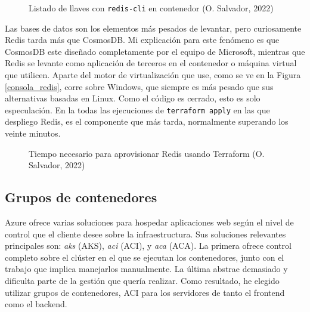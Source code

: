 \documentclass[11pt]{article}
\begin{document}
\begin{flushleft}
		\begin{figure}[htb]
			\centering
			\caption{Listado de llaves con \texttt{redis-cli} en contenedor (O. Salvador, 2022)}
		\end{figure}
	
	Las bases de datos son los elementos más pesados de levantar, pero curiosamente Redis tarda más que CosmosDB. Mi explicación para este fenómeno es que CosmosDB este diseñado completamente por el equipo de Microsoft, mientras que Redis se levante como aplicación de terceros en el contenedor o máquina virtual que utilicen. Aparte del motor de virtualización que use, como se ve en la Figura \ref{consola_redis}, corre sobre Windows, que siempre es más pesado que sus alternativas basadas en Linux. Como el código es cerrado, esto es solo especulación. En la todas las ejecuciones de \texttt{terraform apply} en las que despliego Redis, es el componente que más tarda, normalmente superando los veinte minutos.
	\linebreak
	
	\begin{figure}[htb]
		\centering
		\caption{Tiempo necesario para aprovisionar Redis usando Terraform (O. Salvador, 2022)}
	\end{figure}

	
	\bigskip
	\bigskip
	
	\subsection{Grupos de contenedores}
	Azure ofrece varias soluciones para hospedar aplicaciones web según el nivel de control que el cliente desee sobre la infraestructura. Sus soluciones relevantes principales son: \textit{\acrlong{aks}} (AKS), \textit{\acrlong{aci}} (ACI), y \textit{\acrlong{aca}} (ACA). La primera ofrece control completo sobre el clúster en el que se ejecutan los contenedores, junto con el trabajo que implica manejarlos manualmente. La última abstrae demasiado y dificulta parte de la gestión que quería realizar. Como resultado, he elegido utilizar grupos de contenedores, ACI para los servidores de tanto el frontend como el backend.
	\linebreak
	

\end{flushleft}
\end{document}
